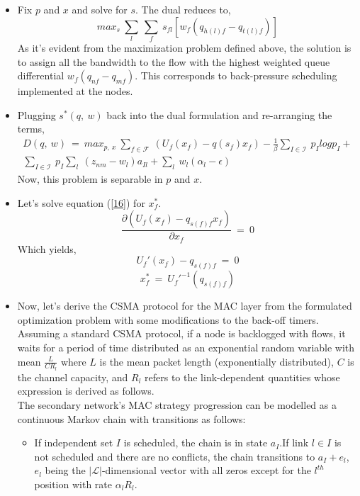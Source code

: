 \documentclass[12pt, draftcls, onecolumn]{IEEEtran}
\begin{document}
\begin{itemize}
    \item Fix $p$ and $x$ and solve for $s$. The dual reduces to,
    \[max_s\ \sum_{l}\ \sum_{f}\ s_{fl}[w_f(q_{h(l)f} - q_{t(l)f})]\]
    As it's evident from the maximization problem defined above, the solution is to assign all the bandwidth to the flow with the highest weighted queue differential $w_f(q_{nf} - q_{mf})$. This corresponds to {back-pressure scheduling} implemented at the nodes.
    \item Plugging $s^*(q,\ w)$ back into the dual formulation and re-arranging the terms,
    \begin{equation}\label{16}
        \begin{aligned}
            D(q,\ w)\ =\ max_{p,\ x}\ \sum_{f \in \mathcal{F}}\ (U_f(x_f) - q(s_f)x_f) - \frac{1}{\beta}\sum_{I \in \mathcal{I}}\ p_I log p_I + \\\sum_{I \in \mathcal{I}}\ p_I\sum_{l}\ (z_{nm} - w_l)a_{Il} + \sum_{l}\ w_l(\alpha_l - \epsilon)
        \end{aligned}
    \end{equation}
    Now, this problem is separable in $p$ and $x$.
    \item Let's solve equation (\ref{16}) for $x_f^*$.
    \[\frac{\partial (U_f(x_f) - q_{s(f)f}x_f)}{\partial x_f}\ =\ 0\]
    Which yields,
    \[U_f'(x_f) - q_{s(f)f}\ =\ 0\]
    \[x_f^*\ =\ U_f'^{-1}(q_{s(f)f})\]
    \item Now, let's derive the CSMA protocol for the MAC layer from the formulated optimization problem with some modifications to the back-off timers.
    \\Assuming a standard CSMA protocol, if a node is backlogged with flows, it waits for a period of time distributed as an exponential random variable with mean $\frac{L}{CR_l}$ where $L$ is the mean packet length (exponentially distributed), $C$ is the channel capacity, and $R_l$ refers to the link-dependent quantities whose expression is derived as follows.
    \\The secondary network's MAC strategy progression can be modelled as a continuous Markov chain with transitions as follows:
    \begin{itemize}
        \item If independent set $I$ is scheduled, the chain is in state $a_I$.If link $l \in I$ is not scheduled and there are no conflicts, the chain transitions to $a_I + e_l$, $e_l$ being the $|\mathcal{L}|$-dimensional vector with all zeros except for the $l^{th}$ position with rate $\alpha_l R_l$.

\end{itemize}
\end{itemize}
\end{document}
